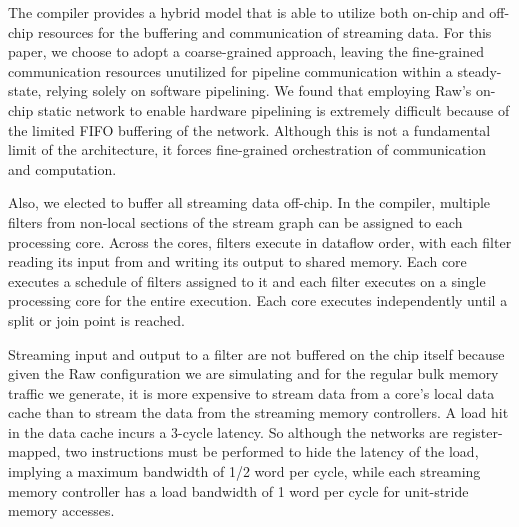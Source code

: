 The compiler provides a hybrid model that is able to utilize both
on-chip and off-chip resources for the buffering and communication of
streaming data.  For this paper, we choose to adopt a coarse-grained
approach, leaving the fine-grained communication resources unutilized
for pipeline communication within a steady-state, relying solely on
software pipelining. We found that employing Raw's on-chip static
network to enable hardware pipelining is extremely difficult because
of the limited FIFO buffering of the network.  Although this is not a
fundamental limit of the architecture, it forces fine-grained
orchestration of communication and computation.

Also, we elected to buffer all streaming data off-chip.  In the
compiler, multiple filters from non-local sections of the stream graph
can be assigned to each processing core.  Across the cores, filters
execute in dataflow order, with each filter reading its input from and
writing its output to shared memory. Each core executes a schedule of
filters assigned to it and each filter executes on a single processing
core for the entire execution. Each core executes independently until
a split or join point is reached.


Streaming input and output to a filter are not buffered on the chip
itself because given the Raw configuration we are simulating and for
the regular bulk memory traffic we generate, it is more expensive to
stream data from a core's local data cache than to stream the data
from the streaming memory controllers. A load hit in the data cache
incurs a 3-cycle latency.  So although the networks are
register-mapped, two instructions must be performed to hide the
latency of the load, implying a maximum bandwidth of 1/2 word per
cycle, while each streaming memory controller has a load bandwidth of
1 word per cycle for unit-stride memory accesses.

